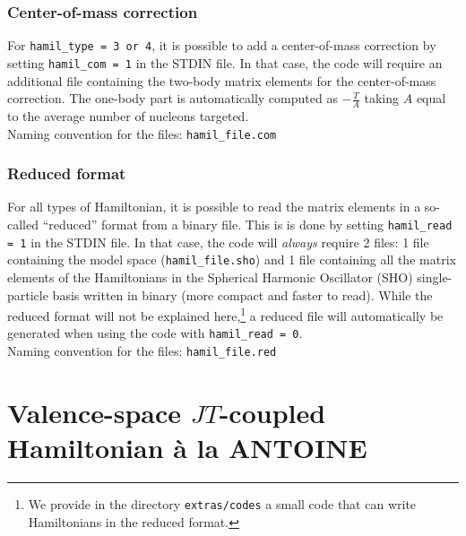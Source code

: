 \documentclass[a4paper,11pt]{article}
\renewcommand{\tt}[1]{\texttt{#1}}
\begin{document}
\subsubsection*{Center-of-mass correction}
For \tt{hamil\_type = 3 or 4}, it is possible to add a center-of-mass correction by setting \tt{hamil\_com = 1} in the
STDIN file. In that case, the code will require an additional file containing the two-body matrix elements for the center-of-mass correction.
The one-body part is automatically computed as $-\frac{T}{A}$ taking $A$ equal to the average number of nucleons targeted. \\
Naming convention for the files: \tt{hamil\_file.com} 

\subsubsection*{Reduced format}
For all types of Hamiltonian, it is possible to read the matrix elements  in a so-called ``reduced'' format from a binary file.
This is is done by setting \tt{hamil\_read = 1} in the STDIN file. In that case, the code will \emph{always} require 2 files: 1 file containing
the model space (\tt{hamil\_file.sho}) and 1 file containing all the matrix elements of the Hamiltonians in the Spherical Harmonic 
Oscillator (SHO) single-particle basis written in binary (more compact and faster to read). 
While the reduced format will not be explained here,\footnote{We provide in the directory \tt{extras/codes} a small code that can write Hamiltonians in the reduced format.} 
a reduced file will automatically be generated when using the code with \tt{hamil\_read = 0}. \\
Naming convention for the files: \tt{hamil\_file.red} 

%
%
\section{Valence-space $JT$-coupled Hamiltonian à la ANTOINE}
\end{document}
